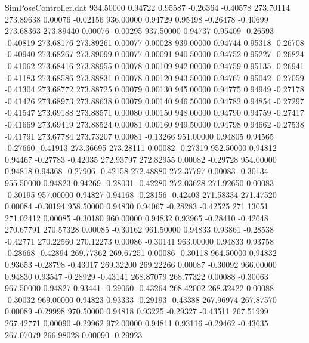\begin{filecontents}{SimPoseController.dat}
 934.50000    0.94722    0.95587    -0.26364   -0.40578  273.70114  273.89638    0.00076   -0.02156
 936.00000    0.94729    0.95498    -0.26478   -0.40699  273.68363  273.89440    0.00076   -0.00295
 937.50000    0.94737    0.95409    -0.26593   -0.40819  273.68176  273.89261    0.00077    0.00028
 939.00000    0.94744    0.95318    -0.26708   -0.40940  273.68267  273.89099    0.00077    0.00091
 940.50000    0.94752    0.95227    -0.26824   -0.41062  273.68416  273.88955    0.00078    0.00109
 942.00000    0.94759    0.95135    -0.26941   -0.41183  273.68586  273.88831    0.00078    0.00120
 943.50000    0.94767    0.95042    -0.27059   -0.41304  273.68772  273.88725    0.00079    0.00130
 945.00000    0.94775    0.94949    -0.27178   -0.41426  273.68973  273.88638    0.00079    0.00140
 946.50000    0.94782    0.94854    -0.27297   -0.41547  273.69188  273.88571    0.00080    0.00150
 948.00000    0.94790    0.94759    -0.27417   -0.41669  273.69419  273.88524    0.00081    0.00160
 949.50000    0.94798    0.94662    -0.27538   -0.41791  273.67784  273.73207    0.00081   -0.13266
 951.00000    0.94805    0.94565    -0.27660   -0.41913  273.36695  273.28111    0.00082   -0.27319
 952.50000    0.94812    0.94467    -0.27783   -0.42035  272.93797  272.82955    0.00082   -0.29728
 954.00000    0.94818    0.94368    -0.27906   -0.42158  272.48880  272.37797    0.00083   -0.30134
 955.50000    0.94823    0.94269    -0.28031   -0.42280  272.03628  271.92650    0.00083   -0.30195
 957.00000    0.94827    0.94168    -0.28156   -0.42403  271.58334  271.47520    0.00084   -0.30194
 958.50000    0.94830    0.94067    -0.28283   -0.42525  271.13051  271.02412    0.00085   -0.30180
 960.00000    0.94832    0.93965    -0.28410   -0.42648  270.67791  270.57328    0.00085   -0.30162
 961.50000    0.94833    0.93861    -0.28538   -0.42771  270.22560  270.12273    0.00086   -0.30141
 963.00000    0.94833    0.93758    -0.28668   -0.42894  269.77362  269.67251    0.00086   -0.30118
 964.50000    0.94832    0.93653    -0.28798   -0.43017  269.32200  269.22266    0.00087   -0.30092
 966.00000    0.94830    0.93547    -0.28929   -0.43141  268.87079  268.77322    0.00088   -0.30063
 967.50000    0.94827    0.93441    -0.29060   -0.43264  268.42002  268.32422    0.00088   -0.30032
 969.00000    0.94823    0.93333    -0.29193   -0.43388  267.96974  267.87570    0.00089   -0.29998
 970.50000    0.94818    0.93225    -0.29327   -0.43511  267.51999  267.42771    0.00090   -0.29962
 972.00000    0.94811    0.93116    -0.29462   -0.43635  267.07079  266.98028    0.00090   -0.29923

\end{filecontents}
